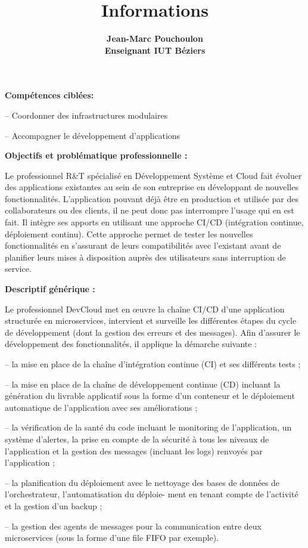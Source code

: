 \documentclass{article}
\title{Informations}
\date{\displaydate{articleDate}}
\author{\bfseries Jean-Marc Pouchoulon\mdseries\\Enseignant IUT Béziers\\}
\begin{document}
\maketitle
{}

\textbf{Compétences ciblées:}

-- Coordonner des infrastructures modulaires

-- Accompagner le développement d'applications

\textbf{Objectifs et problématique professionnelle :}

Le professionnel R\&T spécialisé en Développement Système et Cloud fait évoluer des applications existantes au sein de
son entreprise en développant de nouvelles fonctionnalités. L'application pouvant déjà être en production et utilisée par des
collaborateurs ou des clients, il ne peut donc pas interrompre l'usage qui en est fait. Il intègre ses apports en utilisant une
approche CI/CD (intégration continue, déploiement continu). Cette approche permet de tester les nouvelles fonctionnalités
en s'assurant de leurs compatibilités avec l'existant avant de planifier leurs mises à disposition auprès des utilisateurs sans
interruption de service.

\textbf{Descriptif générique :}

Le professionnel DevCloud met en œuvre la chaîne CI/CD d'une application structurée en microservices, intervient et surveille
les différentes étapes du cycle de développement (dont la gestion des erreurs et des messages). Afin d'assurer le développement des fonctionnalités, il applique la démarche suivante :

-- la mise en place de la chaîne d'intégration continue (CI) et ses différents tests ;

-- la mise en place de la chaîne de développement continue (CD) incluant la génération du livrable applicatif sous la forme
d'un conteneur et le déploiement automatique de l'application avec ses améliorations ;

-- la vérification de la santé du code incluant le monitoring de l'application, un système d'alertes, la prise en compte de la
sécurité à tous les niveaux de l'application et la gestion des messages (incluant les logs) renvoyés par l'application ;

-- la planification du déploiement avec le nettoyage des bases de données de l'orchestrateur, l'automatisation du déploie-
ment en tenant compte de l'activité et la gestion d'un backup ;

-- la gestion des agents de messages pour la communication entre deux microservices (sous la forme d'une file FIFO par
exemple).
\end{document}
